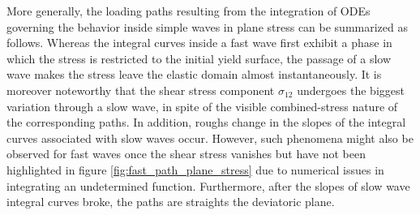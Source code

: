 More generally, the loading paths resulting from the integration of ODEs governing the behavior inside simple waves in plane stress can be summarized as follows.
Whereas the integral curves inside a fast wave first exhibit a phase in which the stress is restricted to the initial yield surface, the passage of a slow wave makes the stress leave the elastic domain almost instantaneously.
It is moreover noteworthy that the shear stress component $\sigma_{12}$ undergoes the biggest variation through a slow wave, in spite of the visible combined-stress nature of the corresponding paths.
In addition, roughs change in the slopes of the integral curves associated with slow waves occur.
However, such phenomena might also be observed for fast waves once the shear stress vanishes but have not been highlighted in figure \ref{fig:fast_path_plane_stress} due to numerical issues in integrating an undetermined function.
Furthermore, after the slopes of slow wave integral curves broke, the paths are straights the deviatoric plane.

